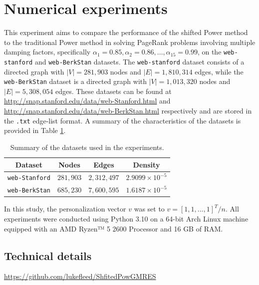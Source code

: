 
\section{Numerical experiments}\label{sec:exp}


This experiment aims to compare the performance of the shifted Power method to the traditional Power method in solving PageRank problems involving multiple damping factors, specifically ${ \alpha_1 = 0.85, \alpha_2 = 0.86, ... , \alpha_{15} = 0.99 }$, on the \texttt{web-stanford} and \texttt{web-BerkStan} datasets. The \texttt{web-stanford} dataset consists of a directed graph with $|V| = 281,903$ nodes and $|E| = 1,810,314$ edges, while the \texttt{web-BerkStan} dataset is a directed graph with $|V| = 1, 013, 320$ nodes and $|E| = 5, 308, 054$ edges. These datasets can be found at \url{http://snap.stanford.edu/data/web-Stanford.html} and \url{http://snap.stanford.edu/data/web-BerkStan.html} respectively and are stored in the \texttt{.txt} edge-list format. A summary of the characteristics of the datasets is provided in Table \ref{tab:datasets}.

\begin{table}[h]
\centering
\begin{tabular}{|c|c|c|c|}
\hline
\textbf{Dataset} & \textbf{Nodes} & \textbf{Edges} & \textbf{Density} \\ \hline
\texttt{web-Stanford} & $281,903$ & $2,312,497$ & $2.9099 \times 10^{-5}$ \\ \hline
\texttt{web-BerkStan} & $685,230$ & $7,600,595$ & $1.6187 \times 10^{-5}$ \\ \hline
\end{tabular}
\caption{Summary of the datasets used in the experiments.}
\label{tab:datasets}
\end{table}

\noindent In this study, the personalization vector $v$ was set to $v = [1, 1, ... , 1]^T/n$. All experiments were conducted using Python 3.10 on a 64-bit Arch Linux machine equipped with an AMD Ryzen™ 5 2600 Processor and 16 GB of RAM.

\subsection{Technical details}

\begin{problem}
    \centering
    \url{https://github.com/lukefleed/ShfitedPowGMRES}
\end{problem}

